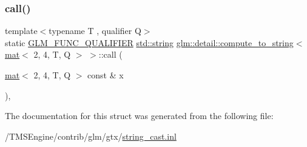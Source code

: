 \subsubsection{\texorpdfstring{call()}{call()}}
{\footnotesize\ttfamily template$<$typename T , qualifier Q$>$ \\
static \hyperlink{setup_8hpp_a33fdea6f91c5f834105f7415e2a64407}{G\+L\+M\+\_\+\+F\+U\+N\+C\+\_\+\+Q\+U\+A\+L\+I\+F\+I\+ER} \hyperlink{_s_d_l__opengl__glext_8h_ae84541b4f3d8e1ea24ec0f466a8c568b}{std\+::string} \hyperlink{structglm_1_1detail_1_1compute__to__string}{glm\+::detail\+::compute\+\_\+to\+\_\+string}$<$ \hyperlink{structglm_1_1mat}{mat}$<$ 2, 4, T, Q $>$ $>$\+::call (\begin{DoxyParamCaption}\item[{\hyperlink{structglm_1_1mat}{mat}$<$ 2, 4, T, Q $>$ const \&}]{x }\end{DoxyParamCaption})\hspace{0.3cm}{\ttfamily [inline]}, {\ttfamily [static]}}



The documentation for this struct was generated from the following file\+:\begin{DoxyCompactItemize}
\item 
/\+T\+M\+S\+Engine/contrib/glm/gtx/\hyperlink{string__cast_8inl}{string\+\_\+cast.\+inl}\end{DoxyCompactItemize}

